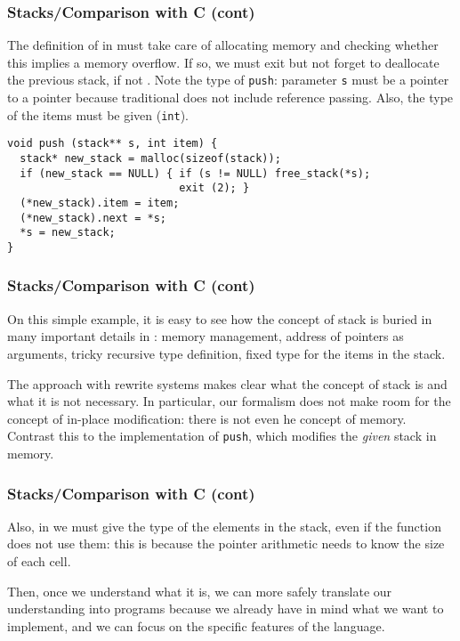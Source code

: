 %
\begin{frame}[containsverbatim]
\frametitle{Stacks/Comparison with C (cont)}

The definition of  in \C must take care of allocating
memory and checking whether this implies a memory overflow. If so, we
must exit but not forget to deallocate the previous stack, if not
. Note the type of \verb+push+: parameter \verb|s| must be
a pointer to a pointer because traditional \C does not include
reference passing. Also, the type of the items must be given
(\verb|int|).
{\small
\begin{verbatim}
void push (stack** s, int item) {
  stack* new_stack = malloc(sizeof(stack));
  if (new_stack == NULL) { if (s != NULL) free_stack(*s);
                           exit (2); }
  (*new_stack).item = item;
  (*new_stack).next = *s;
  *s = new_stack;
}
\end{verbatim}
}

\end{frame}

%
\begin{frame}[containsverbatim]
\frametitle{Stacks/Comparison with C (cont)}

On this simple example, it is easy to see how the concept of stack is
buried in many important details in \C: memory management, address of
pointers as arguments, tricky recursive type definition, fixed type
for the items in the stack.

\bigskip

The approach with rewrite systems makes clear what the concept of
stack is and what it is not necessary. In particular, our formalism
does not make room for the concept of in-place modification: there is
not even he concept of memory. Contrast this to the \C implementation
of \verb|push|, which modifies the \emph{given} stack in memory.

\end{frame}

%
\begin{frame}
\frametitle{Stacks/Comparison with C (cont)}

Also, in \C we must give the type of the elements in the stack, even
if the function does not use them: this is because the pointer
arithmetic needs to know the size of each cell.

\bigskip

Then, once we understand what it is, we can more safely
translate our understanding into programs because we already have in
mind what we want to implement, and we can focus on the specific
features of the language.

\end{frame}


